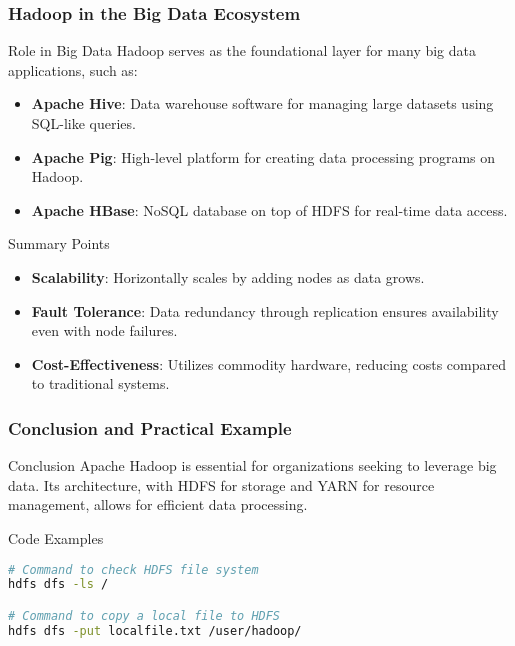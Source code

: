 \documentclass{beamer}
\begin{document}
\begin{frame}[fragile]
    \frametitle{Hadoop in the Big Data Ecosystem}
    \begin{block}{Role in Big Data}
        Hadoop serves as the foundational layer for many big data applications, such as:
        \begin{itemize}
            \item \textbf{Apache Hive}: Data warehouse software for managing large datasets using SQL-like queries.
            \item \textbf{Apache Pig}: High-level platform for creating data processing programs on Hadoop.
            \item \textbf{Apache HBase}: NoSQL database on top of HDFS for real-time data access.
        \end{itemize}
    \end{block}

    \begin{block}{Summary Points}
        \begin{itemize}
            \item \textbf{Scalability}: Horizontally scales by adding nodes as data grows.
            \item \textbf{Fault Tolerance}: Data redundancy through replication ensures availability even with node failures.
            \item \textbf{Cost-Effectiveness}: Utilizes commodity hardware, reducing costs compared to traditional systems.
        \end{itemize}
    \end{block}
\end{frame}

\begin{frame}[fragile]
    \frametitle{Conclusion and Practical Example}
    \begin{block}{Conclusion}
        Apache Hadoop is essential for organizations seeking to leverage big data. Its architecture, with HDFS for storage and YARN for resource management, allows for efficient data processing.
    \end{block}

    \begin{block}{Code Examples}
        \begin{lstlisting}[language=bash]
# Command to check HDFS file system
hdfs dfs -ls /

# Command to copy a local file to HDFS
hdfs dfs -put localfile.txt /user/hadoop/
        \end{lstlisting}
    \end{block}
\end{frame}
\end{document}
